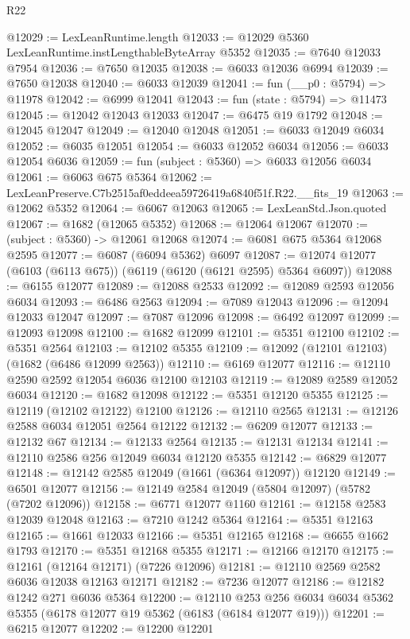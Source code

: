 \begin{lexlean}{R22}
\begin{coremodule}
@12029 := LexLeanRuntime.length
@12033 := @12029 @5360 LexLeanRuntime.instLengthableByteArray @5352
@12035 := @7640 @12033 @7954
@12036 := @7650 @12035
@12038 := @6033 @12036 @6994
@12039 := @7650 @12038
@12040 := @6033 @12039
@12041 := fun (__p0 : @5794) => @11978
@12042 := @6999 @12041
@12043 := fun (state : @5794) => @11473
@12045 := @12042 @12043 @12033
@12047 := @6475 @19 @1792
@12048 := @12045 @12047
@12049 := @12040 @12048
@12051 := @6033 @12049 @6034
@12052 := @6035 @12051
@12054 := @6033 @12052 @6034
@12056 := @6033 @12054 @6036
@12059 := fun (subject : @5360) => @6033 @12056 @6034
@12061 := @6063 @675 @5364
@12062 := LexLeanPreserve.C7b2515af0eddeea59726419a6840f51f.R22.__fits_19
@12063 := @12062 @5352
@12064 := @6067 @12063
@12065 := LexLeanStd.Json.quoted
@12067 := @1682 (@12065 @5352)
@12068 := @12064 @12067
@12070 := (subject : @5360) -> @12061 @12068
@12074 := @6081 @675 @5364 @12068 @2595
@12077 := @6087 (@6094 @5362) @6097
@12087 := @12074 @12077 (@6103 (@6113 @675)) (@6119 (@6120 (@6121 @2595) @5364 @6097))
@12088 := @6155 @12077
@12089 := @12088 @2533
@12092 := @12089 @2593 @12056 @6034
@12093 := @6486 @2563
@12094 := @7089 @12043
@12096 := @12094 @12033 @12047
@12097 := @7087 @12096
@12098 := @6492 @12097
@12099 := @12093 @12098
@12100 := @1682 @12099
@12101 := @5351 @12100
@12102 := @5351 @2564
@12103 := @12102 @5355
@12109 := @12092 (@12101 @12103) (@1682 (@6486 @12099 @2563))
@12110 := @6169 @12077
@12116 := @12110 @2590 @2592 @12054 @6036 @12100 @12103
@12119 := @12089 @2589 @12052 @6034
@12120 := @1682 @12098
@12122 := @5351 @12120 @5355
@12125 := @12119 (@12102 @12122) @12100
@12126 := @12110 @2565
@12131 := @12126 @2588 @6034 @12051 @2564 @12122
@12132 := @6209 @12077
@12133 := @12132 @67
@12134 := @12133 @2564
@12135 := @12131 @12134
@12141 := @12110 @2586 @256 @12049 @6034 @12120 @5355
@12142 := @6829 @12077
@12148 := @12142 @2585 @12049 (@1661 (@6364 @12097)) @12120
@12149 := @6501 @12077
@12156 := @12149 @2584 @12049 (@5804 @12097) (@5782 (@7202 @12096))
@12158 := @6771 @12077 @1160
@12161 := @12158 @2583 @12039 @12048
@12163 := @7210 @1242 @5364
@12164 := @5351 @12163
@12165 := @1661 @12033
@12166 := @5351 @12165
@12168 := @6655 @1662 @1793
@12170 := @5351 @12168 @5355
@12171 := @12166 @12170
@12175 := @12161 (@12164 @12171) (@7226 @12096)
@12181 := @12110 @2569 @2582 @6036 @12038 @12163 @12171
@12182 := @7236 @12077
@12186 := @12182 @1242 @271 @6036 @5364
@12200 := @12110
    @253
    @256
    @6034
    @6034
    @5362
    @5355
    (@6178 @12077 @19 @5362 (@6183 (@6184 @12077 @19)))
@12201 := @6215 @12077
@12202 := @12200 @12201

\end{coremodule}
\end{lexlean}
